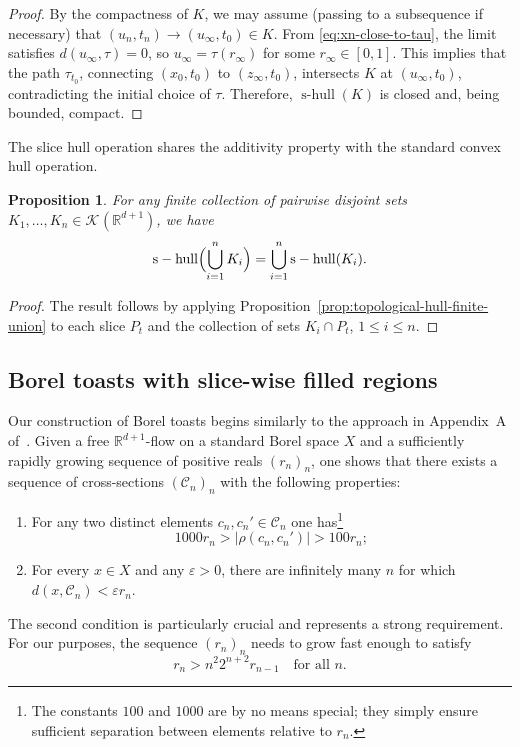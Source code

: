 \documentclass[12pt]{paper}
\numberwithin{equation}{section}
\theoremstyle{plain}
\newtheorem{proposition}[theorem]{Proposition}
\theoremstyle{definition}
\newcommand{\R}{\mathbb{R}}
\newcommand{\vietoris}[2][]{\mathcal{K}_{#1}(#2)}
\DeclareMathOperator{\shull}{\mathrm{s-hull}}
\renewcommand{\epsilon}{\varepsilon}
\begin{document}
\begin{proof}
  By the compactness of \(K\), we may assume (passing to a subsequence if necessary) that
  \((u_{n}, t_{n}) \to (u_{\infty}, t_{0}) \in K\). From \eqref{eq:xn-close-to-tau}, the
  limit satisfies \(d(u_{\infty}, \tau) = 0\), so \(u_{\infty} = \tau(r_{\infty})\) for
  some \(r_{\infty} \in [0,1]\). This implies that the path \(\tau_{t_{0}}\), connecting
  \((x_{0}, t_{0})\) to \((z_{\infty}, t_{0})\), intersects \(K\) at
  \((u_{\infty}, t_{0})\), contradicting the initial choice of \(\tau\). Therefore,
  \(\shull(K)\) is closed and, being bounded, compact.
\end{proof}

The slice hull operation shares the additivity property with the standard convex hull operation.

\begin{proposition}
  \label{prop:slice-hull-additivity}
  For any finite collection of pairwise disjoint sets
  \(K_{1}, \ldots, K_{n} \in \vietoris{\R^{d+1}}\), we have
  \[\shull\Bigl(\bigcup_{i=1}^{n}K_{i}\Bigr) = \bigcup_{i=1}^{n}\shull(K_{i}).\]
\end{proposition}

\begin{proof}
  The result follows by applying Proposition~\ref{prop:topological-hull-finite-union} to each slice
  \(P_{t}\) and the collection of sets \(K_{i} \cap P_{t}\), \(1 \le i \le n\).
\end{proof}


\subsection{Borel toasts with slice-wise filled regions}
\label{sec:borel-toasts-slice-filled}


Our construction of Borel toasts begins similarly to the approach in Appendix~A
of~\cite{marksBorelCircleSquaring2017}. Given a free \(\R^{d+1}\)-flow on a standard Borel space
\(X\) and a sufficiently rapidly growing sequence of positive reals \((r_n)_n\), one shows that
there exists a sequence of cross-sections \((\mathcal{C}_n)_n\) with the following properties:
\begin{enumerate}[leftmargin=.6cm, label={\sf \arabic*}., ref={\sf \arabic*}]
\item For any two distinct elements \(c_n, c_n' \in \mathcal{C}_n\) one has\footnote{The constants
    \(100\) and \(1000\) are by no means special; they simply ensure sufficient separation between
    elements relative to \(r_n\).}
  \[1000r_{n} > |\rho(c_n, c_n')| > 100r_n;\]
\item\label{item:boykin-jackson} For every \(x \in X\) and any \(\epsilon > 0\), there are
  infinitely many \(n\) for which \(d(x, \mathcal{C}_n) < \epsilon r_n\).
\end{enumerate}
The second condition is particularly crucial and represents a strong requirement. For our purposes,
the sequence \((r_{n})_{n}\) needs to grow fast enough to satisfy
\begin{equation}
  \label{eq:rn-growth-rate}
  r_n > n^{2}2^{n+2}r_{n-1} \quad \text{for all } n.
\end{equation}
\end{document}
